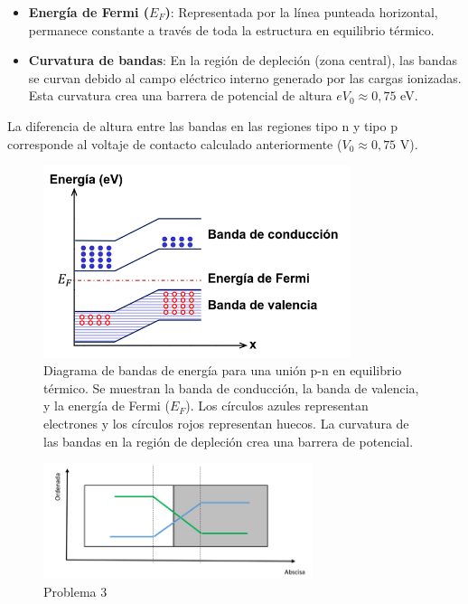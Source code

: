 \documentclass[
  11pt,
  letterpaper,
   addpoints,
  ]{exam}
\begin{document}
\begin{questions}
\begin{solution}
\begin{itemize}
        \item \textbf{Energía de Fermi ($E_F$)}: Representada por la línea punteada horizontal, permanece constante a través de toda la estructura en equilibrio térmico.
        
        \item \textbf{Curvatura de bandas}: En la región de depleción (zona central), las bandas se curvan debido al campo eléctrico interno generado por las cargas ionizadas. Esta curvatura crea una barrera de potencial de altura $eV_0 \approx 0{,}75$ eV.
    \end{itemize}

    La diferencia de altura entre las bandas en las regiones tipo n y tipo p corresponde al voltaje de contacto calculado anteriormente ($V_0 \approx 0{,}75$ V).

    \begin{figure}[H]
        \centering
        \includegraphics[width=0.8\textwidth]{../figures/Auxiliar_2_10}
        \caption{Diagrama de bandas de energía para una unión p-n en equilibrio térmico. Se muestran la banda de conducción, la banda de valencia, y la energía de Fermi ($E_F$). Los círculos azules representan electrones y los círculos rojos representan huecos. La curvatura de las bandas en la región de depleción crea una barrera de potencial.}
        \label{fig:bandas_pn}
    \end{figure}

\end{solution}
\begin{figure}[H]
    \centering
    \includegraphics[width=0.7\textwidth]{../figures/Auxiliar_2_1}
    \caption{Problema 3}
    \label{fig:p3}
\end{figure}


\end{questions}
\end{document}
